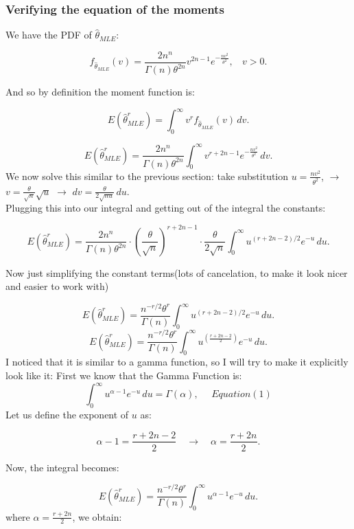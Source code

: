 \documentclass[12pt]{article}
\begin{document}
\subsubsection*{Verifying the equation of the moments}
We have the PDF of \(\hat{\theta}_{MLE}\):

\[
  f_{\hat{\theta}_{MLE}}(v) = \frac{2 n^n}{\Gamma(n) \theta^{2n}} v^{2n - 1} e^{- \frac{n v^2}{\theta^2}}, \ \ \ \  v > 0.
\]

And so by definition the moment function is:

\[
  E(\hat{\theta}^r_{MLE}) = \int_0^\infty v^r f_{\hat{\theta}_{MLE}}(v) \, dv.
\]


\[
  E(\hat{\theta}^r_{MLE}) = \frac{2 n^n}{\Gamma(n) \theta^{2n}} \int_0^\infty v^{r + 2n - 1} e^{- \frac{n v^2}{\theta^2}} \, dv.
\]
We now solve this similar to the previous section: take substitution \( u = \frac{n v^2}{\theta^2} \), $\rightarrow$ \( v = \frac{\theta}{\sqrt{n}} \sqrt{u} \) $\rightarrow$ \( dv = \frac{\theta}{2 \sqrt{n u}} \, du \).\\

Plugging this into our integral and getting out of the integral the constants:

\[
  E(\hat{\theta}^r_{MLE}) = \frac{2 n^n}{\Gamma(n) \theta^{2n}} \cdot \left( \frac{\theta}{\sqrt{n}} \right)^{r + 2n - 1} \cdot \frac{\theta}{2 \sqrt{n}} \int_0^\infty u^{(r + 2n - 2)/2} e^{-u} \, du.
\]

Now just simplifying the constant terms(lots of cancelation, to make it look nicer and easier to work with)

\[
  E(\hat{\theta}^r_{MLE}) = \frac{n^{-r/2} \theta^r}{\Gamma(n)} \int_0^\infty u^{(r + 2n - 2)/2} e^{-u} \, du.
\]
\[
  E(\hat{\theta}^r_{MLE}) = \frac{n^{-r/2} \theta^r}{\Gamma(n)} \int_0^\infty u^{\left(\frac{r + 2n - 2}{2}\right)} e^{-u} \, du.
\]
I noticed that it is similar to a gamma function, so I will try to make it explicitly look like it:
First we know that the Gamma Function is:
\[
  \int_0^\infty u^{\alpha - 1} e^{-u} \, du = \Gamma(\alpha), \ \ \ \ \ \ Equation(1)
\]
Let us define the exponent of \(u\) as:

\[
  \alpha - 1 = \frac{r + 2n - 2}{2} \quad \rightarrow \quad \alpha = \frac{r + 2n}{2}.
\]

Now, the integral becomes:

\[
  E(\hat{\theta}^r_{MLE}) = \frac{n^{-r/2} \theta^r}{\Gamma(n)} \int_0^\infty u^{\alpha - 1} e^{-u} \, du.
\]
where \( \alpha = \frac{r + 2n}{2} \), we obtain:
\end{document}

